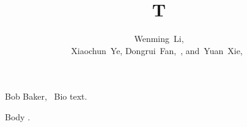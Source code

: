 \documentclass[journal]{IEEEtran}
\begin{document}
\title{T}
\author{Wenming~Li, \\ Xiaochun~Ye, Dongrui~Fan,~, and~Yuan~Xie,~}
\maketitle
\begin{IEEEbiography}{Bob Baker,~}
Bio text.
\end{IEEEbiography}
Body .
\end{document}
